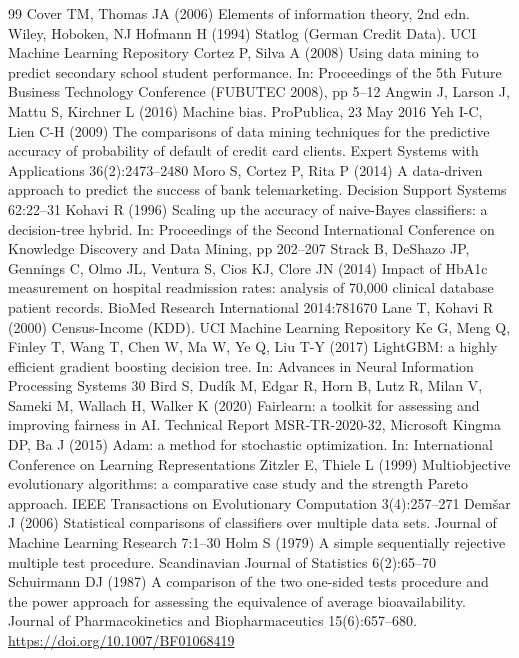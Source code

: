 \documentclass[pdflatex,sn-basic,Numbered,lineno]{sn-jnl}
\begin{document}
\begin{thebibliography}{99}
 Cover TM, Thomas JA (2006) Elements of information theory, 2nd edn. Wiley, Hoboken, NJ
 Hofmann H (1994) Statlog (German Credit Data). UCI Machine Learning Repository
 Cortez P, Silva A (2008) Using data mining to predict secondary school student performance. In: Proceedings of the 5th Future Business Technology Conference (FUBUTEC 2008), pp 5–12
 Angwin J, Larson J, Mattu S, Kirchner L (2016) Machine bias. ProPublica, 23 May 2016
 Yeh I-C, Lien C-H (2009) The comparisons of data mining techniques for the predictive accuracy of probability of default of credit card clients. Expert Systems with Applications 36(2):2473–2480
 Moro S, Cortez P, Rita P (2014) A data-driven approach to predict the success of bank telemarketing. Decision Support Systems 62:22–31
 Kohavi R (1996) Scaling up the accuracy of naive-Bayes classifiers: a decision-tree hybrid. In: Proceedings of the Second International Conference on Knowledge Discovery and Data Mining, pp 202–207
 Strack B, DeShazo JP, Gennings C, Olmo JL, Ventura S, Cios KJ, Clore JN (2014) Impact of HbA1c measurement on hospital readmission rates: analysis of 70,000 clinical database patient records. BioMed Research International 2014:781670
 Lane T, Kohavi R (2000) Census-Income (KDD). UCI Machine Learning Repository
 Ke G, Meng Q, Finley T, Wang T, Chen W, Ma W, Ye Q, Liu T-Y (2017) LightGBM: a highly efficient gradient boosting decision tree. In: Advances in Neural Information Processing Systems 30
 Bird S, Dudík M, Edgar R, Horn B, Lutz R, Milan V, Sameki M, Wallach H, Walker K (2020) Fairlearn: a toolkit for assessing and improving fairness in AI. Technical Report MSR-TR-2020-32, Microsoft
 Kingma DP, Ba J (2015) Adam: a method for stochastic optimization. In: International Conference on Learning Representations
 Zitzler E, Thiele L (1999) Multiobjective evolutionary algorithms: a comparative case study and the strength Pareto approach. IEEE Transactions on Evolutionary Computation 3(4):257–271
 Demšar J (2006) Statistical comparisons of classifiers over multiple data sets. Journal of Machine Learning Research 7:1–30
 Holm S (1979) A simple sequentially rejective multiple test procedure. Scandinavian Journal of Statistics 6(2):65–70
 Schuirmann DJ (1987) A comparison of the two one-sided tests procedure and the power approach for assessing the equivalence of average bioavailability. Journal of Pharmacokinetics and Biopharmaceutics 15(6):657–680. \url{https://doi.org/10.1007/BF01068419}

\end{thebibliography}
\end{document}
